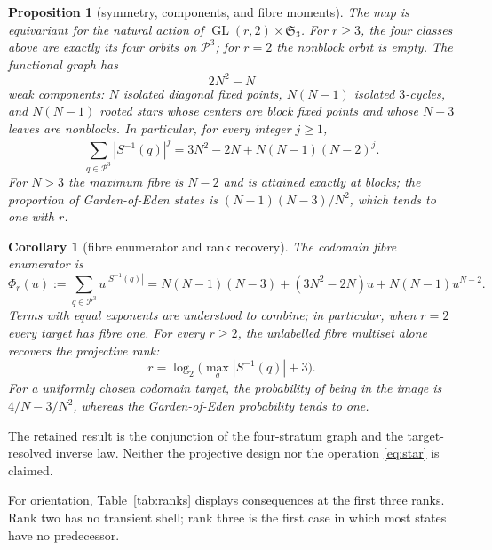 \documentclass[a4paper,10pt]{amsart}
\newtheorem{proposition}[theorem]{Proposition}
\newtheorem{corollary}[theorem]{Corollary}
\theoremstyle{remark}
\newcommand{\cP}{\mathcal P}
\begin{document}
\begin{proposition}[symmetry, components, and fibre moments]\label{prop:structure}
The map is equivariant for the natural action of
$\operatorname{GL}(r,2)\times\mathfrak S_3$.  For $r\ge3$, the four classes
above are exactly its four orbits on $\cP^3$; for $r=2$ the nonblock orbit is
empty.  The functional graph has
\begin{equation}\label{eq:components}
 2N^2-N
\end{equation}
weak components: $N$ isolated diagonal fixed points, $N(N-1)$ isolated
$3$-cycles, and $N(N-1)$ rooted stars whose centers are block fixed points
and whose $N-3$ leaves are nonblocks.  In particular, for every integer
$j\ge1$,
\begin{equation}\label{eq:moments}
 \sum_{q\in\cP^3}|S^{-1}(q)|^j
 =3N^2-2N+N(N-1)(N-2)^j.
\end{equation}
For $N>3$ the maximum fibre is $N-2$ and is attained exactly at blocks; the
proportion of Garden-of-Eden states is
$(N-1)(N-3)/N^2$, which tends to one with $r$.
\end{proposition}

\begin{corollary}[fibre enumerator and rank recovery]\label{cor:fibrepoly}
The codomain fibre enumerator is
\begin{equation}\label{eq:fibrepoly}
 \Phi_r(u):=\sum_{q\in\cP^3}u^{|S^{-1}(q)|}
 =N(N-1)(N-3)+(3N^2-2N)u+N(N-1)u^{N-2}.
\end{equation}
Terms with equal exponents are understood to combine; in particular, when
$r=2$ every target has fibre one.  For every $r\ge2$, the unlabelled fibre
multiset alone recovers the projective rank:
\begin{equation}\label{eq:recover}
 r=\log_2\bigl(\max_q|S^{-1}(q)|+3\bigr).
\end{equation}
For a uniformly chosen codomain target, the probability of being in the image
is $4/N-3/N^2$, whereas the Garden-of-Eden probability tends to one.
\end{corollary}

The retained result is the conjunction of the four-stratum graph and the
target-resolved inverse law.  Neither the projective design nor the operation
\eqref{eq:star} is claimed.

For orientation, Table~\ref{tab:ranks} displays consequences at the first
three ranks.  Rank two has no transient shell; rank three is the first case in
which most states have no predecessor.
\end{document}
